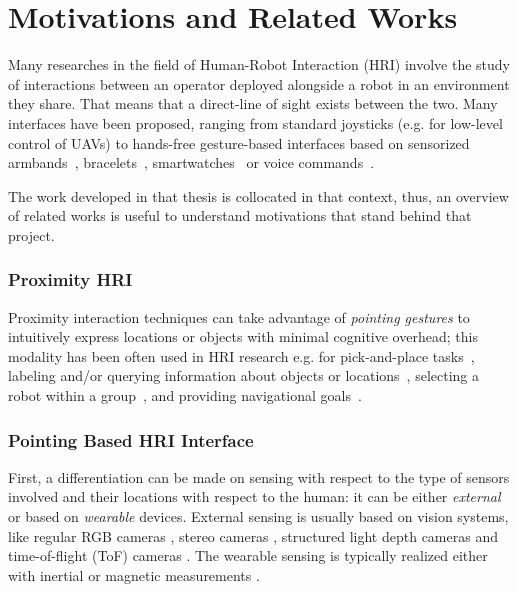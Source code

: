 \section*{Motivations and Related Works} \label{sec:related}
Many researches in the field of Human-Robot Interaction (HRI) involve the study of interactions between an operator deployed alongside a robot in an environment they share. That means that a direct-line of sight exists between the two. Many interfaces have been proposed, ranging from standard joysticks (e.g. for low-level control of UAVs) to hands-free gesture-based interfaces based on sensorized armbands~\cite{Wolf2013}, bracelets~\cite{Cacace2016,gromov2018video}, smartwatches~\cite{Villani2017} or voice commands~\cite{Gromov2016}.

The work developed in that thesis is collocated in that context, thus, an overview of related works is useful to understand motivations that stand behind that project.

\subsubsection*{Proximity HRI}
Proximity interaction techniques can take advantage of \emph{pointing gestures} to intuitively express locations or objects with minimal cognitive overhead; this modality has been often used in HRI research e.g. for pick-and-place tasks~\cite{Brooks2006,Droeschel2011,Grossmann2014,Cosgun2015}, labeling and/or querying information about objects or locations~\cite{Brooks2006,Pateraki2014,Akkil2016}, selecting a robot within a group~\cite{Nagi2014a,Pourmehr2013}, and providing navigational goals~\cite{VanDenBergh2011,Abidi2013,Wolf2013,Jevtic2015,Gromov2016,Tolgyessy2017,gromov2018video}.

\subsubsection*{Pointing Based HRI Interface}
First, a differentiation can be made on sensing with respect to the type of sensors involved and their locations with respect to the human: it can be either \emph{external} or based on \emph{wearable} devices.
External sensing is usually based on vision systems, like regular RGB cameras \cite{Pateraki2014,Monajjemi2016}, stereo cameras \cite{Nickel2003}, structured light depth cameras \cite{Cosgun2015} and time-of-flight (ToF) cameras \cite{Droeschel2011}. The wearable sensing is typically realized either with inertial \cite{Wolf2013,Sugiyama2013} or magnetic measurements \cite{Bolt1980,Nickel2003}. 

